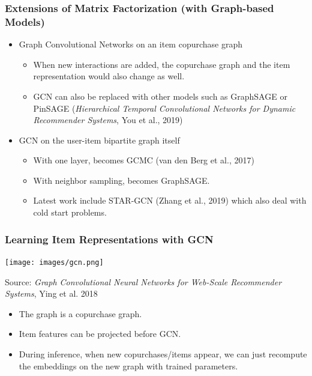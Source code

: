 \documentclass[11pt]{beamer}
\begin{document}
	\begin{frame}
		\frametitle{Extensions of Matrix Factorization \tiny (with Graph-based Models)}
		\begin{itemize}
			\item Graph Convolutional Networks on an item copurchase graph
			\begin{itemize}
				\item When new interactions are added, the copurchase graph and the item representation would also change as well.
				\item GCN can also be replaced with other models such as GraphSAGE or PinSAGE (\textit{Hierarchical Temporal Convolutional Networks for Dynamic Recommender Systems}, You et al., 2019)
			\end{itemize}
			\item GCN on the user-item bipartite graph itself
			\begin{itemize}
				\item With one layer, becomes GCMC (van den Berg et al., 2017)
				\item With neighbor sampling, becomes GraphSAGE.
				\item Latest work include STAR-GCN (Zhang et al., 2019) which also deal with cold start problems.
			\end{itemize}
		\end{itemize}
	\end{frame}

	\begin{frame}
		\frametitle{Learning Item Representations with GCN}
		\begin{center}
			\centering
			\texttt{[image: images/gcn.png]}
			
			{\tiny Source: \textit{Graph Convolutional Neural Networks for Web-Scale Recommender Systems}, Ying et al. 2018}
		\end{center}
		\begin{itemize}
			\item<1-> The graph is a copurchase graph.
			\item<2-> Item features can be projected before GCN.
			\item<3-> During inference, when new copurchases/items appear, we can just recompute the embeddings on the new graph with trained parameters.
		\end{itemize}
	\end{frame}
\end{document}
